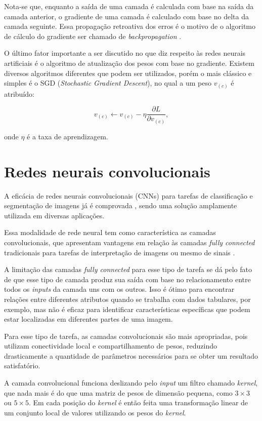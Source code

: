 Nota-se que, enquanto a saída de uma camada é calculada com base na saída da camada anterior, o gradiente de uma camada é calculado com base no delta da camada seguinte. Essa propagação retroativa dos erros é o motivo de o algoritmo de cálculo do gradiente ser chamado de \textit{backpropagation} \cite{backprop}.

O último fator importante a ser discutido no que diz respeito às redes neurais artificiais é o algoritmo de atualização dos pesos com base no gradiente. Existem diversos algoritmos diferentes que podem ser utilizados, porém o mais clássico e simples é o SGD (\textit{Stochastic Gradient Descent}), no qual a um peso $v_{(c)}$ é atribuído:

\begin{equation}
    v_{(c)} \leftarrow v_{(c)} - \eta \frac{\partial L}{\partial v_{(c)}},
\end{equation}

onde $\eta$ é a taxa de aprendizagem.

\section{Redes neurais convolucionais}

A eficácia de redes neurais convolucionais (CNNs) para tarefas de classificação e segmentação de imagens já é comprovada \cite{imagenet-cnn}, sendo uma solução amplamente utilizada em diversas aplicações.

Essa modalidade de rede neural tem como característica as camadas convolucionais, que apresentam vantagens em relação às camadas \textit{fully connected} tradicionais para tarefas de interpretação de imagens ou mesmo de sinais \cite{cnn}.

A limitação das camadas \textit{fully connected} para esse tipo de tarefa se dá pelo fato de que esse tipo de camada produz sua saída com base no relacionamento entre todos os \textit{inputs} da camada uns com os outros. Isso é ótimo para encontrar relações entre diferentes atributos quando se trabalha com dados tabulares, por exemplo, mas não é eficaz para identificar características específicas que podem estar localizadas em diferentes partes de uma imagem.

Para esse tipo de tarefa, as camadas convolucionais são mais apropriadas, pois utilizam conectividade local e compartilhamento de pesos, reduzindo drasticamente a quantidade de parâmetros necessários para se obter um resultado satisfatório.

A camada convolucional funciona deslizando pelo \textit{input} um filtro chamado \textit{kernel}, que nada mais é do que uma matriz de pesos de dimensão pequena, como $3\times3$ ou $5\times5$. Em cada posição do \textit{kernel} é então feita uma transformação linear de um conjunto local de valores utilizando os pesos do \textit{kernel}.

